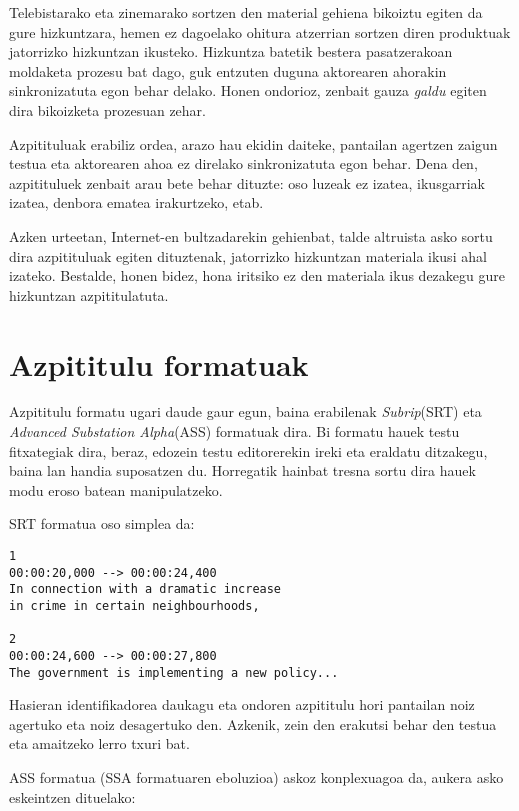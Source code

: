 Telebistarako eta zinemarako sortzen den material gehiena bikoiztu egiten da gure hizkuntzara, hemen ez dagoelako ohitura atzerrian sortzen diren produktuak jatorrizko hizkuntzan ikusteko. Hizkuntza batetik bestera pasatzerakoan moldaketa prozesu bat dago, guk entzuten duguna aktorearen ahorakin sinkronizatuta egon behar delako. Honen ondorioz, zenbait gauza \textit{galdu} egiten dira bikoizketa prozesuan zehar.

Azpitituluak erabiliz ordea, arazo hau ekidin daiteke, pantailan agertzen zaigun testua eta aktorearen ahoa ez direlako sinkronizatuta egon behar. Dena den, azpitituluek zenbait arau bete behar dituzte: oso luzeak ez izatea, ikusgarriak izatea, denbora ematea irakurtzeko, etab.

Azken urteetan, Internet-en bultzadarekin gehienbat, talde altruista asko sortu dira azpitituluak egiten dituztenak, jatorrizko hizkuntzan materiala ikusi ahal izateko. Bestalde, honen bidez, hona iritsiko ez den materiala ikus dezakegu gure hizkuntzan azpititulatuta.

\section{Azpititulu formatuak}
Azpititulu formatu ugari daude gaur egun, baina erabilenak \textit{Subrip}(SRT) eta \textit{Advanced Substation Alpha}(ASS) formatuak dira. Bi formatu hauek testu fitxategiak dira, beraz, edozein testu editorerekin ireki eta eraldatu ditzakegu, baina lan handia suposatzen du. Horregatik hainbat tresna sortu dira hauek modu eroso batean manipulatzeko.

SRT formatua oso simplea da:
\begin{verbatim}
1
00:00:20,000 --> 00:00:24,400
In connection with a dramatic increase
in crime in certain neighbourhoods,

2
00:00:24,600 --> 00:00:27,800
The government is implementing a new policy...
\end{verbatim}
Hasieran identifikadorea daukagu eta ondoren azpititulu hori pantailan noiz agertuko eta noiz desagertuko den. Azkenik, zein den erakutsi behar den testua eta amaitzeko lerro txuri bat.

ASS formatua (SSA formatuaren eboluzioa) askoz konplexuagoa da, aukera asko eskeintzen dituelako:

